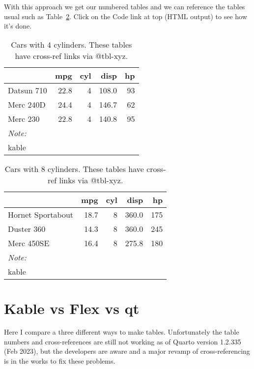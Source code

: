 \documentclass[
  letterpaper,
  oneside]{scrbook}
\begin{document}
With this approach we get our numbered tables and we can reference the
tables usual such as Table~\ref{tbl-cyl8}. Click on the Code link at top
(HTML output) to see how it's done.

\hypertarget{tbl-cyl4}{}
\begin{table}
\caption{\label{tbl-cyl4}Cars with 4 cylinders. These tables have cross-ref links via @tbl-xyz. }\tabularnewline

\centering
\begin{tabular}[t]{lrrrr}
\toprule
  & mpg & cyl & disp & hp\\
\midrule
Datsun 710 & 22.8 & 4 & 108.0 & 93\\
Merc 240D & 24.4 & 4 & 146.7 & 62\\
Merc 230 & 22.8 & 4 & 140.8 & 95\\
\bottomrule
\multicolumn{5}{l}{\rule{0pt}{1em}\textit{Note: }}\\
\multicolumn{5}{l}{\rule{0pt}{1em}kable}\\
\end{tabular}
\end{table}

\hypertarget{tbl-cyl8}{}
\begin{table}
\caption{\label{tbl-cyl8}Cars with 8 cylinders. These tables have cross-ref links via @tbl-xyz. }\tabularnewline

\centering
\begin{tabular}[t]{lrrrr}
\toprule
  & mpg & cyl & disp & hp\\
\midrule
Hornet Sportabout & 18.7 & 8 & 360.0 & 175\\
Duster 360 & 14.3 & 8 & 360.0 & 245\\
Merc 450SE & 16.4 & 8 & 275.8 & 180\\
\bottomrule
\multicolumn{5}{l}{\rule{0pt}{1em}\textit{Note: }}\\
\multicolumn{5}{l}{\rule{0pt}{1em}kable}\\
\end{tabular}
\end{table}


\hypertarget{sec-kableflexgt}{%
\chapter{Kable vs Flex vs qt}\label{sec-kableflexgt}}

Here I compare a three different ways to make tables. Unfortunately the
table numbers and cross-references are still not working as of Quarto
version 1.2.335 (Feb 2023), but the developers are aware and a major
revamp of cross-referencing is in the works to fix these problems.
\end{document}
